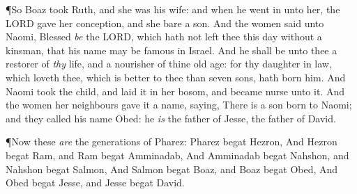 \documentclass[11pt,letterpaper,oneside]{memoir}
\begin{document}
\P So Boaz took Ruth, and she was his wife: and when he went in unto
her, the \textsc{LORD} gave her conception, and she bare a son.  And
the women said unto Naomi, Blessed \emph{be} the \textsc{LORD}, which
hath not left thee this day without a kinsman, that his name may be
famous in Israel.  And he shall be unto thee a restorer of \emph{thy}
life, and a nourisher of thine old age: for thy daughter in law, which
loveth thee, which is better to thee than seven sons, hath born him.
And Naomi took the child, and laid it in her bosom, and became nurse
unto it.  And the women her neighbours gave it a name, saying, There
is a son born to Naomi; and they called his name Obed: he \emph{is}
the father of Jesse, the father of David.

\P Now these \emph{are} the generations of Pharez: Pharez begat
Hezron,  And Hezron begat Ram, and Ram begat Amminadab,  And Amminadab
begat Nahshon, and Nahshon begat Salmon,  And Salmon begat Boaz, and
Boaz begat Obed,  And Obed begat Jesse, and Jesse begat David.
\end{document}
